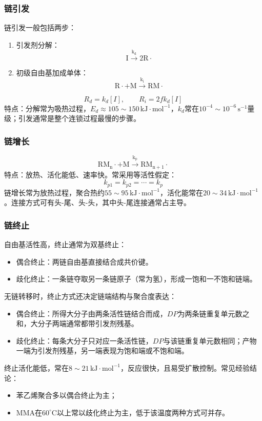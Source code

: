 ﻿\documentclass[12pt,a4paper]{article}
\begin{document}
\subsubsection{链引发}
链引发一般包括两步：
\begin{enumerate}[1)]
  \item 引发剂分解：
  \[
  \mathrm{I \xrightarrow{k_d} 2R\cdot}
  \]
  \item 初级自由基加成单体：
  \[
  \mathrm{R\cdot + M \xrightarrow{k_i} RM\cdot}
  \]
\end{enumerate}
\[
R_d=k_d[I],\qquad R_i=2fk_d[I]
\]
特点：分解常为吸热过程，$E_d\approx105\sim150\,\mathrm{kJ\cdot mol^{-1}}$，$k_d$常在$10^{-4}\sim10^{-6}\,\mathrm{s^{-1}}$量级；引发通常是整个连锁过程最慢的步骤。

\subsubsection{链增长}
\[
\mathrm{RM_n\cdot + M \xrightarrow{k_p} RM_{n+1}\cdot}
\]
特点：放热、活化能低、速率快。常采用等活性假定：
\[
k_{p1}=k_{p2}=\cdots=k_p
\]
链增长常为放热过程，聚合热约$55\sim95\,\mathrm{kJ\cdot mol^{-1}}$，活化能常在$20\sim34\,\mathrm{kJ\cdot mol^{-1}}$。连接方式可有头-尾、头-头，其中头-尾连接通常占主导。

\subsubsection{链终止}
自由基活性高，终止通常为双基终止：
\begin{itemize}
  \item 偶合终止：两链自由基直接结合成共价键。
  \item 歧化终止：一条链夺取另一条链原子（常为氢），形成一饱和一不饱和链端。
\end{itemize}
无链转移时，终止方式还决定链端结构与聚合度表达：
\begin{itemize}
  \item 偶合终止：所得大分子由两条活性链结合而成，$DP$为两条链重复单元数之和，大分子两端通常都带引发剂残基。
  \item 歧化终止：每条大分子只对应一条活性链，$DP$与该链重复单元数相同；产物一端为引发剂残基，另一端表现为饱和端或不饱和端。
\end{itemize}
终止活化能低，常在$8\sim21\,\mathrm{kJ\cdot mol^{-1}}$，反应很快，且易受扩散控制。常见经验结论：
\begin{itemize}
  \item 苯乙烯聚合多以偶合终止为主；
  \item MMA在$60^\circ\mathrm{C}$以上常以歧化终止为主，低于该温度两种方式可并存。
\end{itemize}
\end{document}
